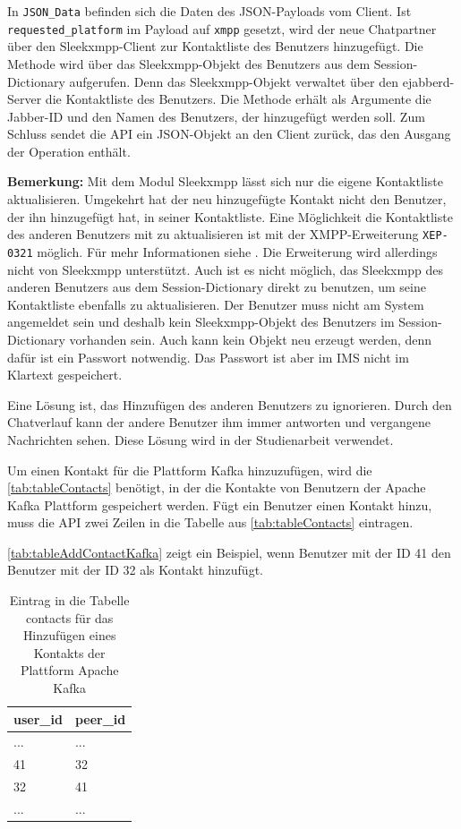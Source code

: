 \documentclass[a4paper,titlepage,halfparskip,12pt]{scrreprt}
\begin{document}
\begin{onehalfspacing}
In \texttt{JSON\_Data} befinden sich die Daten des \acs{JSON}-Payloads vom Client. Ist \texttt{requested\_platform} im Payload auf \texttt{xmpp} gesetzt, wird der neue Chatpartner über den Sleekxmpp-Client zur Kontaktliste des Benutzers hinzugefügt. Die Methode wird über das Sleekxmpp-Objekt des Benutzers aus dem Session-Dictionary aufgerufen. Denn das Sleekxmpp-Objekt verwaltet über den ejabberd-Server die Kontaktliste des Benutzers. Die Methode erhält als Argumente die Jabber-ID und den Namen des Benutzers, der hinzugefügt werden soll. Zum Schluss sendet die \acs{API} ein \acs{JSON}-Objekt an den Client zurück, das den Ausgang der Operation enthält.

\textbf{Bemerkung:} Mit dem Modul Sleekxmpp lässt sich nur die eigene Kontaktliste aktualisieren. Umgekehrt hat der neu hinzugefügte Kontakt nicht den Benutzer, der ihn hinzugefügt hat, in seiner Kontaktliste. Eine Möglichkeit die Kontaktliste des anderen Benutzers mit zu aktualisieren ist mit der \acs{XMPP}-Erweiterung \texttt{XEP-0321} möglich. Für mehr Informationen siehe \cite{xep0321remoteRosterMgmt}. Die Erweiterung wird allerdings nicht von Sleekxmpp unterstützt. Auch ist es nicht möglich, das Sleekxmpp des anderen Benutzers aus dem Session-Dictionary direkt zu benutzen, um seine Kontaktliste ebenfalls zu aktualisieren. Der Benutzer muss nicht am System angemeldet sein und deshalb kein Sleekxmpp-Objekt des Benutzers im Session-Dictionary vorhanden sein. Auch kann kein Objekt neu erzeugt werden, denn dafür ist ein Passwort notwendig. Das Passwort ist aber im \acs{IMS} nicht im Klartext gespeichert.

Eine Lösung ist, das Hinzufügen des anderen Benutzers zu ignorieren. Durch den Chatverlauf kann der andere Benutzer ihm immer antworten und vergangene Nachrichten sehen. Diese Lösung wird in der Studienarbeit verwendet.

Um einen Kontakt für die Plattform Kafka hinzuzufügen, wird die \autoref{tab:tableContacts} benötigt, in der die Kontakte von Benutzern der Apache Kafka Plattform gespeichert werden. Fügt ein Benutzer einen Kontakt hinzu, muss die \acs{API} zwei Zeilen in die Tabelle aus \autoref{tab:tableContacts} eintragen.

\autoref{tab:tableAddContactKafka} zeigt ein Beispiel, wenn Benutzer mit der ID 41 den Benutzer mit der ID 32 als Kontakt hinzufügt.

\begin{table}[h]
\centering
\caption{Eintrag in die Tabelle contacts für das Hinzufügen eines Kontakts der Plattform Apache Kafka}
\begin{tabular}{|l|l|}
\hline
\textbf{user\_id} &  \textbf{peer\_id} \\
\hline
... & ... \\
\hline
41 & 32 \\
\hline
32 & 41 \\
\hline
... & ... \\
\hline
\end{tabular}
\label{tab:tableAddContactKafka}
\end{table}


\end{onehalfspacing}
\end{document}

